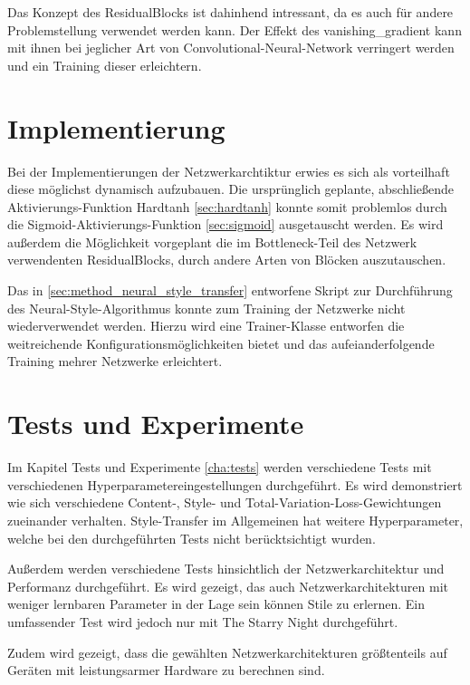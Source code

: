 Das Konzept des ResidualBlocks ist dahinhend intressant, da es auch für andere Problemstellung verwendet werden kann. Der Effekt des \gls{vanishing_gradient} kann mit ihnen bei jeglicher Art von Convolutional-Neural-Network verringert werden und ein Training dieser erleichtern.

\section{Implementierung}

Bei der Implementierungen der Netzwerkarchtiktur erwies es sich als vorteilhaft diese möglichst dynamisch aufzubauen. Die ursprünglich geplante, abschließende Aktivierungs-Funktion Hardtanh \ref{sec:hardtanh} konnte somit problemlos durch die Sigmoid-Aktivierungs-Funktion \ref{sec:sigmoid} ausgetauscht werden. Es wird außerdem die Möglichkeit vorgeplant die im Bottleneck-Teil des Netzwerk verwendenten ResidualBlocks, durch andere Arten von Blöcken auszutauschen.

Das in \ref{sec:method_neural_style_transfer} entworfene Skript zur Durchführung des Neural-Style-Algorithmus konnte zum Training der Netzwerke nicht wiederverwendet werden. Hierzu wird eine Trainer-Klasse entworfen die weitreichende Konfigurationsmöglichkeiten bietet und das aufeianderfolgende Training mehrer Netzwerke erleichtert.

\section{Tests und Experimente}

Im Kapitel Tests und Experimente \ref{cha:tests} werden verschiedene Tests mit verschiedenen Hyperparametereingestellungen durchgeführt.
Es wird demonstriert wie sich verschiedene Content-, Style- und Total-Variation-Loss-Gewichtungen zueinander verhalten. Style-Transfer im Allgemeinen hat weitere Hyperparameter, welche bei den durchgeführten Tests nicht berücktsichtigt wurden.

Außerdem werden verschiedene Tests hinsichtlich der Netzwerkarchitektur und Performanz durchgeführt. Es wird gezeigt, das auch Netzwerkarchitekturen mit weniger lernbaren Parameter in der Lage sein können Stile zu erlernen. Ein umfassender Test wird jedoch nur mit The Starry Night \cite{the_starry_night_img} durchgeführt.

Zudem wird gezeigt, dass die gewählten Netzwerkarchitekturen größtenteils auf Geräten mit leistungsarmer Hardware zu berechnen sind.